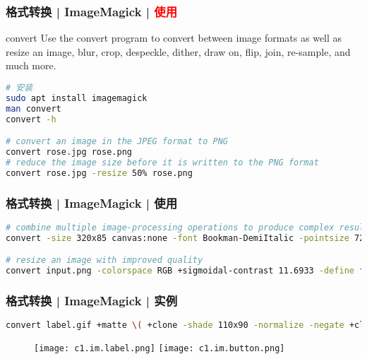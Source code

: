 \begin{frame}[fragile]
  \frametitle{格式转换 | ImageMagick | \textcolor{red}{使用}}
  \begin{block}{convert}
Use the convert program to convert between image formats as well as resize an image, blur, crop, despeckle, dither, draw on, flip, join, re-sample, and much more. 
  \end{block}
\begin{lstlisting}[language=bash]
# 安装
sudo apt install imagemagick
man convert
convert -h

# convert an image in the JPEG format to PNG
convert rose.jpg rose.png
# reduce the image size before it is written to the PNG format
convert rose.jpg -resize 50% rose.png
\end{lstlisting}
\end{frame}

\begin{frame}[fragile]
  \frametitle{格式转换 | ImageMagick | 使用}
\begin{lstlisting}[language=bash]
# combine multiple image-processing operations to produce complex results
convert -size 320x85 canvas:none -font Bookman-DemiItalic -pointsize 72 -draw "text 25,60 \'Magick\'" -channel RGBA -blur 0x6 -fill darkred -stroke magenta -draw "text 20,55 \'Magick\'" fuzzy-magick.png

# resize an image with improved quality
convert input.png -colorspace RGB +sigmoidal-contrast 11.6933 -define filter:filter=Sinc -define filter:window=Jinc -define filter:lobes=3 -resize 400% -sigmoidal-contrast 11.6933 -colorspace sRGB output.png
\end{lstlisting}
\end{frame}

\begin{frame}[fragile]
  \frametitle{格式转换 | ImageMagick | 实例}
\begin{lstlisting}[language=bash]
convert label.gif +matte \( +clone -shade 110x90 -normalize -negate +clone -compose Plus -composite \) \( -clone 0 -shade 110x50 -normalize -channel BG -fx 0 +channel -matte \) -delete 0 +swap -compose Multiply -composite button.gif
\end{lstlisting}
\begin{figure}
  \centering
  \texttt{[image: c1.im.label.png]}\qquad
  \texttt{[image: c1.im.button.png]}
\end{figure}
\end{frame}

